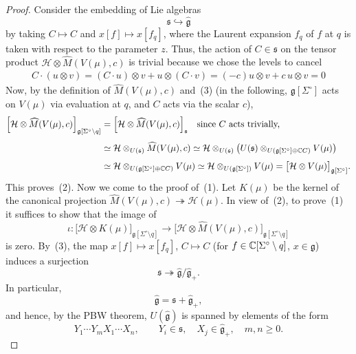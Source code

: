 \documentclass[12pt]{article}
\begin{document}
\begin{proof}
    Consider the embedding of Lie algebras
    \[
        \mathfrak s \hookrightarrow \widehat{\mathfrak g}
    \]
    by taking $C\mapsto C$ and $x[f]\mapsto x[f_q]$, where the Laurent expansion
    $f_q$ of $f$ at $q$ is taken with respect to the parameter $z$.
    Thus, the action of $C\in\mathfrak s$ on the tensor product
    $\mathcal H\otimes\widehat M(V(\mu),c)$ is trivial because we chose the levels to cancel \begin{align*}
        C\cdot(u\otimes v)=(C\cdot u)\otimes v+u\otimes (C\cdot v)
        =(-c)u\otimes v+c\,u\otimes v=0
    \end{align*}
    Now, by the definition of $\widehat M(V(\mu),c)$ and~(3)
    (in the following, $\mathfrak g[\Sigma^\circ]$ acts on $V(\mu)$ via evaluation at $q$,
    and $C$ acts via the scalar $c$),
    \[
        \begin{aligned}
            \Bigl[\mathcal H\otimes\widehat M(V(\mu),c)\Bigr]_{\mathfrak g[\Sigma^\circ\setminus q]}
             & =
            \Bigl[\mathcal H\otimes\widehat M(V(\mu),c)\Bigr]_{\mathfrak s}
            \quad\text{since $C$ acts trivially,}                                             \\[4pt]
             & \simeq
            \mathcal H\otimes_{U(\mathfrak s)}\widehat M(V(\mu),c)
            \simeq
            \mathcal H\otimes_{U(\mathfrak s)}
            \bigl(U(\mathfrak s)\otimes_{U(\mathfrak g[\Sigma^\circ]\oplus \mathbb{C} C)}V(\mu)\bigr) \\[4pt]
             & \simeq
            \mathcal H\otimes_{U(\mathfrak g[\Sigma^\circ]\oplus \mathbb{C} C)}V(\mu)
            \simeq
            \mathcal H\otimes_{U(\mathfrak g[\Sigma^\circ])}V(\mu)
            =\bigl[\mathcal H\otimes V(\mu)\bigr]_{\mathfrak g[\Sigma^\circ]}.
        \end{aligned}
    \]
    This proves~(2). Now we come to the proof of~(1).
    Let $K(\mu)$ be the kernel of the canonical projection
    $\widehat M(V(\mu),c)\twoheadrightarrow \mathcal H(\mu)$.
    In view of~(2), to prove~(1) it suffices to show that the image of
    \[
        \iota:
        \bigl[\mathcal H\otimes K(\mu)\bigr]_{\mathfrak g[\Sigma^\circ\setminus q]}
        \longrightarrow
        \bigl[\mathcal H\otimes \widehat M(V(\mu),c)\bigr]_{\mathfrak g[\Sigma^\circ\setminus q]}
    \]
    is zero.  By~(3), the map $x[f]\mapsto x[f_q]$, $C\mapsto C$
    (for $f\in\mathbb{C}[\Sigma^\circ\setminus q]$, $x\in\mathfrak g$)
    induces a surjection
    \[
        \mathfrak s \twoheadrightarrow \widehat{\mathfrak g}/\widehat{\mathfrak g}_+.
    \]
    In particular,
    \[
        \widehat{\mathfrak g}=\mathfrak s+\widehat{\mathfrak g}_+,
    \]
    and hence, by the PBW theorem, $U(\widehat{\mathfrak g})$
    is spanned by elements of the form
    \[
        Y_1\cdots Y_m X_1\cdots X_n,
        \qquad
        Y_i\in\mathfrak s,\quad X_j\in\widehat{\mathfrak g}_+,\quad m,n\ge0.
    \]


\end{proof}
\end{document}

